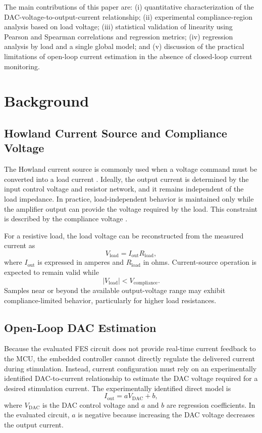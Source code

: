\documentclass[conference]{IEEEtran}
\begin{document}
The main contributions of this paper are: (i) quantitative characterization of the DAC-voltage-to-output-current relationship; (ii) experimental compliance-region analysis based on load voltage; (iii) statistical validation of linearity using Pearson and Spearman correlations and regression metrics; (iv) regression analysis by load and a single global model; and (v) discussion of the practical limitations of open-loop current estimation in the absence of closed-loop current monitoring.

\section{Background}

\subsection{Howland Current Source and Compliance Voltage}

The Howland current source is commonly used when a voltage command must be converted into a load current \cite{HOWLAND_CURRENT_SOURCE}. Ideally, the output current is determined by the input control voltage and resistor network, and it remains independent of the load impedance. In practice, load-independent behavior is maintained only while the amplifier output can provide the voltage required by the load. This constraint is described by the compliance voltage \cite{COMPLIANCE_VOLTAGE}.

For a resistive load, the load voltage can be reconstructed from the measured current as
\begin{equation}
V_{\mathrm{load}} = I_{\mathrm{out}} R_{\mathrm{load}},
\label{eq:vload}
\end{equation}
where $I_{\mathrm{out}}$ is expressed in amperes and $R_{\mathrm{load}}$ in ohms. Current-source operation is expected to remain valid while
\begin{equation}
|V_{\mathrm{load}}| < V_{\mathrm{compliance}}.
\label{eq:compliance_condition}
\end{equation}
Samples near or beyond the available output-voltage range may exhibit compliance-limited behavior, particularly for higher load resistances.

\subsection{Open-Loop DAC Estimation}

Because the evaluated FES circuit does not provide real-time current feedback to the MCU, the embedded controller cannot directly regulate the delivered current during stimulation. Instead, current configuration must rely on an experimentally identified DAC-to-current relationship to estimate the DAC voltage required for a desired stimulation current. The experimentally identified direct model is
\begin{equation}
I_{\mathrm{out}} = a V_{\mathrm{DAC}} + b,
\label{eq:direct_model}
\end{equation}
where $V_{\mathrm{DAC}}$ is the DAC control voltage and $a$ and $b$ are regression coefficients. In the evaluated circuit, $a$ is negative because increasing the DAC voltage decreases the output current.
\end{document}
